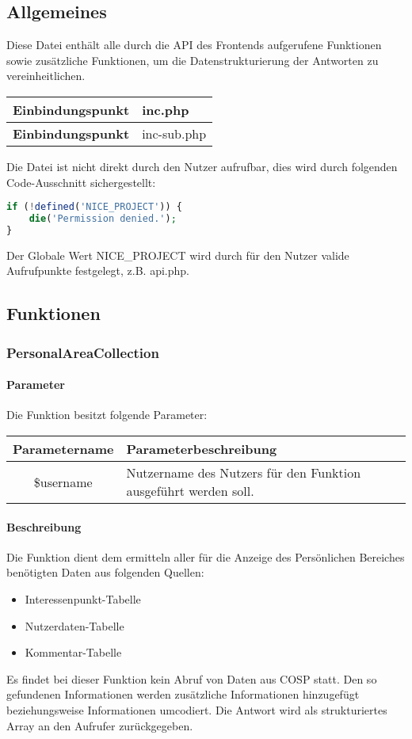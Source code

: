 \subsection{Allgemeines} Diese Datei enthält alle durch die API des Frontends aufgerufene Funktionen sowie zusätzliche Funktionen, um die Datenstrukturierung der Antworten zu vereinheitlichen.
\begin{table}[H]
	\begin{tabular}{|c|p{11cm}|}
		\hline
		\textbf{Einbindungspunkt} & inc.php \\ \hline
		\textbf{Einbindungspunkt} & inc-sub.php \\ \hline
	\end{tabular}
\end{table}
Die Datei ist nicht direkt durch den Nutzer aufrufbar, dies wird durch folgenden Code-Ausschnitt sichergestellt:
\begin{lstlisting}[language=php]
if (!defined('NICE_PROJECT')) {
	die('Permission denied.');
}
\end{lstlisting}
Der Globale Wert {\glqq NICE\_PROJECT\grqq} wird durch für den Nutzer valide Aufrufpunkte festgelegt, z.B. {\glqq api.php\grqq}.
\newpage
\subsection{Funktionen}
\subsubsection{PersonalAreaCollection}
\paragraph{Parameter} Die Funktion besitzt folgende Parameter:
\begin{table}[H]
	\begin{tabular}{|c|p{11cm}|}
		\hline
		\textbf{Parametername} & \textbf{Parameterbeschreibung} \\ \hline
		\$username & Nutzername des Nutzers für den Funktion ausgeführt werden soll. \\ \hline
	\end{tabular}
\end{table}
\paragraph{Beschreibung} Die Funktion dient dem ermitteln aller für die Anzeige des Persönlichen Bereiches benötigten Daten aus folgenden Quellen:
\begin{itemize}
	\item Interessenpunkt-Tabelle
	\item Nutzerdaten-Tabelle
	\item Kommentar-Tabelle
\end{itemize}
Es findet bei dieser Funktion kein Abruf von Daten aus {\glqq COSP\grqq} statt. Den so gefundenen Informationen werden zusätzliche Informationen hinzugefügt beziehungsweise Informationen umcodiert. Die Antwort wird als strukturiertes Array an den Aufrufer zurückgegeben.
